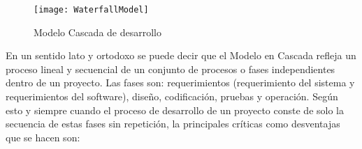 \begin{figure}[h]
  \centering
  \texttt{[image: WaterfallModel]}
  \caption{Modelo Cascada de desarrollo}
  \centering
  \label{fig:WaterfallModel} %
\end{figure}

En un sentido lato y ortodoxo se puede decir que el Modelo en Cascada refleja un proceso lineal y secuencial de un conjunto de procesos o fases independientes dentro de un proyecto. Las fases son: requerimientos (requerimiento del sistema y requerimientos del software), diseño, codificación, pruebas y operación. Según esto y siempre cuando el proceso de desarrollo de un proyecto conste de solo la secuencia de estas fases sin repetición, la principales críticas como desventajas que se hacen son:

